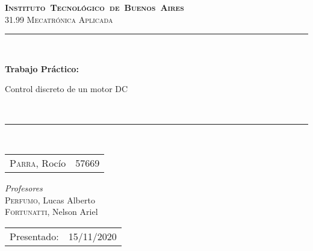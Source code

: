
\begin{titlepage}
\newcommand{\HRule}{\rule{\linewidth}{0.5mm}}
\center
\mbox{\textsc{\LARGE \bfseries {Instituto Tecnol\'ogico de Buenos Aires}}}\\[1.5cm]
\textsc{\Large 31.99 Mecatr\'onica Aplicada}\\[0.5cm]


\HRule \\[0.6cm]
{ \Huge \bfseries Trabajo Pr\'actico:  

 Control discreto de un motor DC
%
 }\\[0.4cm] %
\HRule \\[1.5cm]

\vfill
{\large


\begin{tabular}{lr} 	
\textsc{Parra}, Roc\'io  & 57669 \\
\end{tabular}

\vspace{50px}

\emph{Profesores}\\
\vspace{3px}
\textsc{Perfumo}, Lucas Alberto\\ 
\textsc{Fortunatti}, Nelson Ariel\\
\vspace{100px}

\begin{tabular}{ll}

Presentado: & 15/11/2020\\


\end{tabular}

}

\vfill

\end{titlepage}